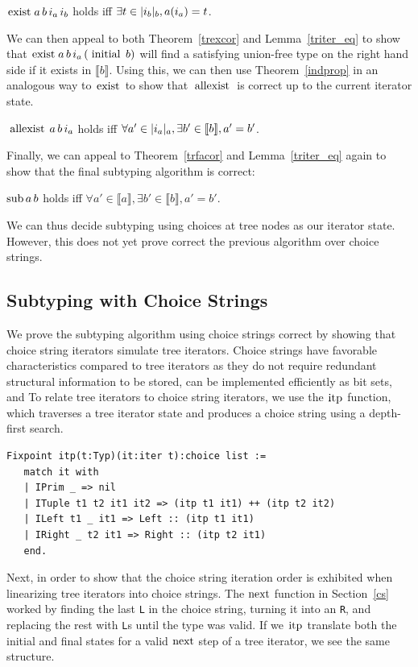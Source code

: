 \documentclass[a4paper,english]{lipics-v2019}
\newcommand{\denotes}[1]{\llbracket #1 \rrbracket}
\renewcommand{\L}{{\tt L}\xspace}
\newcommand{\Ls}{{\tt L}s\xspace}
\newcommand{\R}{{\tt R}\xspace}
\renewcommand{\c}[1]{\ensuremath{\text{\lstinline{#1}}}\xspace}
\begin{document}
\begin{theorem}\label{trexcor}
$\c{exist}\,a\,b\,i_a\,i_b$ holds iff $\exists t\in|i_b|_{b},a(i_a)= t$.
\end{theorem}

\noindent
We can then appeal to both Theorem~\ref{trexcor} and Lemma~\ref{triter_eq}
to show that $\c{exist}\,a\,b\,i_a\,(\c{initial}\,b)$ will find a satisfying
union-free type on the right hand side if it exists in $\denotes{b}$. Using
this, we can then use Theorem~\ref{indprop} in an analogous way to \c{exist}
to show that \c{allexist} is correct up to the current iterator state.

\begin{theorem}\label{trfacor}
$\c{allexist}\,a\,b\,i_a$ holds iff $\forall a'\in \irch{i_a}{a},
  \exists b'\in \denotes{b}, a'= b'$.
\end{theorem}

\noindent
Finally, we can appeal to Theorem~\ref{trfacor} and Lemma~\ref{triter_eq}
again to show that the final subtyping algorithm is correct:

\begin{theorem}\label{trsub}
$\c{sub}\,a\,b$ holds iff $\forall a' \in \denotes{a}, \exists b' \in
  \denotes{b}, a' = b'$.
\end{theorem}

We can thus decide subtyping using choices at tree nodes as our iterator
state.  However, this does not yet prove correct the previous algorithm over
choice strings.

\subsection{Subtyping with Choice Strings}

We prove the subtyping algorithm using choice strings correct by 
showing that choice string iterators simulate tree iterators. Choice strings
have favorable characteristics compared to tree iterators as they do not require
redundant structural information to be stored, can be implemented efficiently as 
bit sets, and  To 
relate tree iterators to choice string iterators, we use the \c{itp} 
function, which traverses a tree iterator state and produces a choice
string using a depth-first search.

\begin{small}\begin{lstlisting}
Fixpoint itp(t:Typ)(it:iter t):choice list :=
   match it with
   | IPrim _ => nil
   | ITuple t1 t2 it1 it2 => (itp t1 it1) ++ (itp t2 it2)
   | ILeft t1 _ it1 => Left :: (itp t1 it1)
   | IRight _ t2 it1 => Right :: (itp t2 it1)
   end.
\end{lstlisting}\end{small}
\noindent
Next, in order to show that the choice string iteration order
is exhibited when linearizing tree iterators into choice strings. 
The \c{next} function in Section~\ref{cs} worked by finding the last
\L in the choice string, turning it into an \R, and replacing the rest
with \Ls until the type was valid. If we \c{itp} translate both the initial
and final states for a valid \c{next} step of a tree iterator, we see the same
structure.
\end{document}
